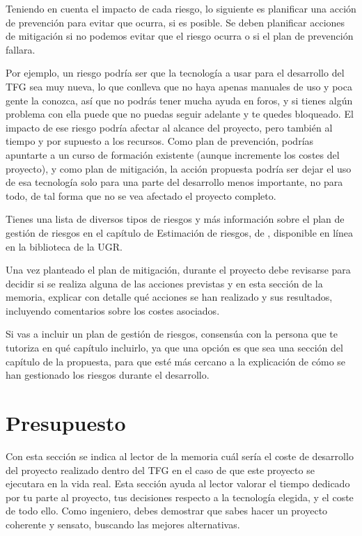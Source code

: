 Teniendo en cuenta el impacto de cada riesgo, lo siguiente es planificar una acción de prevención para evitar que ocurra, si es posible. Se deben planificar acciones de mitigación si no podemos evitar que el riesgo ocurra o si el plan de prevención fallara.

Por ejemplo, un riesgo podría ser que la tecnología a usar para el desarrollo del TFG sea muy nueva, lo que conlleva que no haya apenas manuales de uso y poca gente la conozca, así que no podrás tener mucha ayuda en foros, y  si tienes algún problema con ella puede que no puedas seguir adelante y te quedes bloqueado. El impacto de ese riesgo podría afectar al alcance del proyecto, pero también al tiempo y por supuesto a los recursos. Como plan de prevención, podrías apuntarte a un curso de formación existente (aunque incremente los costes del proyecto), y como plan de mitigación, la acción propuesta podría ser dejar el uso de esa tecnología solo para una parte del desarrollo menos importante, no para todo, de tal forma que no se vea afectado el proyecto completo.

Tienes una lista de diversos tipos de riesgos y más información sobre el plan de gestión de riesgos en el capítulo de Estimación de riesgos, de \cite{guerin2018gestion}, disponible en línea en la biblioteca de la UGR.

Una vez planteado el plan de mitigación, durante el proyecto debe revisarse para decidir si se realiza alguna de las acciones previstas y en esta sección de la memoria, explicar con detalle qué acciones se han realizado y sus resultados, incluyendo comentarios sobre los costes asociados.

Si vas a incluir un plan de gestión de riesgos, consensúa con la persona que te tutoriza en qué capítulo incluirlo, ya que una opción es que sea una sección del capítulo de la propuesta, para que esté más cercano a la explicación de  cómo se han gestionado los riesgos durante el desarrollo.

\section{Presupuesto}

Con esta sección se indica al lector de la memoria cuál sería el coste de desarrollo del proyecto realizado dentro del TFG en el caso de que este proyecto se ejecutara en la vida real. Esta sección ayuda al lector valorar el tiempo dedicado por tu parte al proyecto, tus decisiones respecto a la tecnología elegida, y el coste de todo ello. Como ingeniero, debes demostrar que sabes hacer un proyecto coherente  y sensato, buscando las mejores alternativas. 

